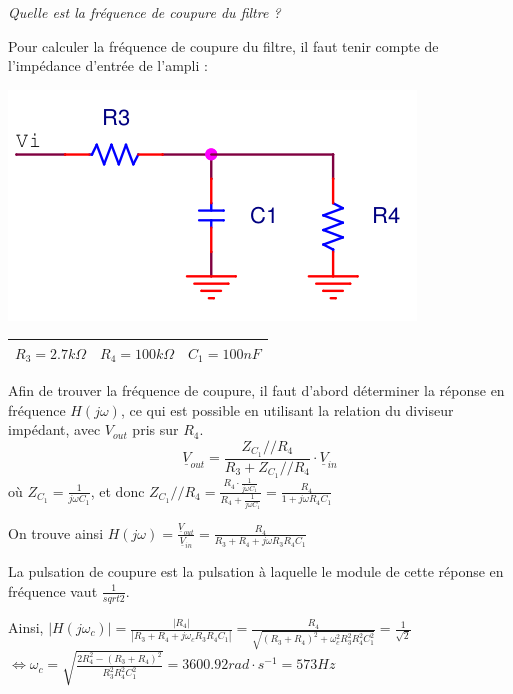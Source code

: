 {
\textit{Quelle est la fréquence de coupure du filtre ?}
}
{%
Pour calculer la fréquence de coupure du filtre, il faut tenir compte de l'impédance
d'entrée de l'ampli :
\begin{center}
\includegraphics[scale=0.35]{filtre.PNG}
\label{fonctionsblocs}

\begin{tabular}{|c||c||c|}\hline
$R_3 = 2.7 k\Omega$ & $R_4 = 100 k\Omega$ & $C_1 = 100 nF$ \\ \hline
\end{tabular}
\end{center}

Afin de trouver la fréquence de coupure, il faut d'abord déterminer la réponse en fréquence $H(j\omega)$, ce qui est possible en utilisant la relation du diviseur impédant, avec $V_{out}$ pris sur $R_4$.
\[\underline{V}_{out} = \frac{Z_{C_1} // R_4}{R_3 + Z_{C_1} // R_4} \cdot \underline{V}_{in}\]
où $Z_{C_1} = \frac{1}{j\omega C_1}$, et donc $Z_{C_1} // R_4 = \frac{R_4 \cdot \frac{1}{j\omega C_1}}{R_4 + \frac{1}{j\omega C_1}} = \frac{R_4}{1 + j\omega R_4 C_1}$

On trouve ainsi $H(j\omega) = \frac{\underline{V}_{out}}{\underline{V}_{in}} = \frac{R_4}{R_3 + R_4 + j\omega R_3 R_4 C_1}$

La pulsation de coupure est la pulsation à laquelle le module de cette réponse en fréquence vaut $\frac{1}{sqrt{2}}$.

Ainsi, $| H(j\omega_c) | = \frac{|R_4|}{|R_3 + R_4 + j\omega_c R_3 R_4 C_1|} = \frac{R_4}{\sqrt{(R_3 + R_4)^2 + \omega_c^2 R_3^2 R_4^2 C_1^2}} = \frac{1}{\sqrt{2}}$\\
$\Leftrightarrow \omega_c = \sqrt{\frac{2R_4^2 - (R_3 + R_4)^2}{R_3^2 R_4^2 C_1^2}} = 3600.92 rad\cdot s^{-1} = 573 Hz$
}

